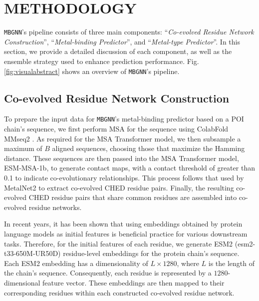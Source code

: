 \documentclass[letterpaper, 10 pt, conference]{ieeeconf}
\begin{document}
\section{METHODOLOGY}
\label{sec:method}
\texttt{MBGNN}'s pipeline consists of three main components: ``\textit{Co-evolved Residue Network Construction}'', ``\textit{Metal-binding Predictor}'', and ``\textit{Metal-type Predictor}''. In this section, we provide a detailed discussion of each component, as well as the ensemble strategy used to enhance prediction performance. Fig. \ref{fig:visualabstract} shows an overview of \texttt{MBGNN}'s pipeline.

\subsection{Co-evolved Residue Network Construction}
\label{subsubsec:feat}
To prepare the input data for \texttt{MBGNN}'s metal-binding predictor based on a POI chain's sequence, we first perform MSA for the sequence using ColabFold MMseq2 \cite{mirdita2022colabfold}. As required for the MSA Transformer model, we then subsample a maximum of $B$ aligned sequences, choosing those that maximize the Hamming distance. These sequences are then passed into the MSA Transformer model, ESM-MSA-1b, to generate contact maps, with a contact threshold of greater than 0.1 to indicate co-evolutionary relationships. This process follows that used by MetalNet2 to extract co-evolved CHED residue pairs. Finally, the resulting co-evolved CHED residue pairs that share common residues are assembled into co-evolved residue networks.

In recent years, it has been shown that using embeddings obtained by protein language models as initial features is beneficial practice for various downstream tasks\cite{10.1093/nsr/nwae391, lmetalsite, mionic,  jha2022prediction,jha2023graph, bepler2021learning}. Therefore, for the initial features of each residue, we generate ESM2\cite{lin2023evolutionary} (esm2-t33-650M-UR50D) residue-level embeddings for the protein chain’s sequence. Each ESM2 embedding has a dimensionality of \( L \times 1280 \), where \( L \) is the length of the chain's sequence. Consequently, each residue is represented by a $1280$-dimensional feature vector. These embeddings are then mapped to their corresponding residues within each constructed co-evolved residue network. 
\end{document}
